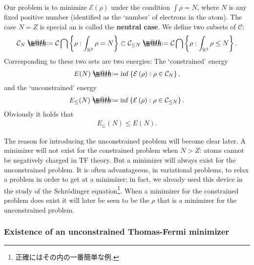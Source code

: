 \documentclass[openany, a4paper, oneside]{book}
\makeatletter
\newcommand*{\defeq}{\mathrel{\rlap{%
\raisebox{0.3ex}{$\m@th\cdot$}}%
\raisebox{-0.3ex}{$\m@th\cdot$}}%
=}
\theoremstyle{break}
\theoremstyle{breakdefn}
\newcommand{\rbk}[1]{\left (#1\right)}
\newcommand{\set}[2]{\left\{#1 : #2\right\}}
\newcommand{\bbRthree}{\mathbb{R}^3}
\newcommand{\calC}{\mathcal{C}}
\newcommand{\calCN}{\mathcal{C}_{N}}
\newcommand{\calCleqN}{\mathcal{C}_{\leq N}}
\newcommand{\calE}{\mathcal{E}}
\makeatother
\begin{document}
Our problem is to minimize $\calE (\rho)$ under the condition $\int \rho = N$,
where $N$ is any fixed positive number (identified as the `number' of electrons in the atom).
The case $N=Z$ is special an is called the \textbf{neutral case}.
We define two subsets of $\calC$:
\begin{align}
 \calCN
 \defeq
 \calC \bigcap \set{\rho}{\int_{\bbRthree} \rho = N}
 \subset
 \calCleqN
 \defeq
 \calC \bigcap \set{\rho}{\int_{\bbRthree} \rho \leq N}.
\end{align}
Corresponding to these two sets are two energies: The `constrained' energy
\begin{align}
 E (N)
 \defeq
 \inf \set{\calE \rbk{\rho}}{\rho \in \calCN},
\end{align}
and the `unconstrained' energy
\begin{align}
 E_{\leq}(N)
 \defeq
 \inf \set{\calE \rbk{\rho}}{\rho \in \calCleqN}. \label{Lieb-Loss_Analysis_chap11_18}
\end{align}
Obviously it holds that
\begin{align}
 E_{\leq} (N)
 \leq
 E (N).
\end{align}

The reason for introducing the unconstrained problem will become clear later.
A minimizer will not exist for the constrained problem when $N > Z$:
atoms cannot be negatively charged in TF theory.
But a minimizer will always exist for the unconstrained problem.
It is often advantageous, in variational problems, to relax a problem in order to get at a minimizer;
in fact, we already used this device in the study of the Schr\"odinger equation\footnote{正確にはその内の一番簡単な例.
 }.
When a minimizer for the constrained problem does exist it will later be seen to be the $\rho$ that is
a minimizer for the unconstrained problem.
\subsubsection{Existence of an unconstrained Thomas-Fermi minimizer}
\label{sec-7-10-3-1-2}
\end{document}
